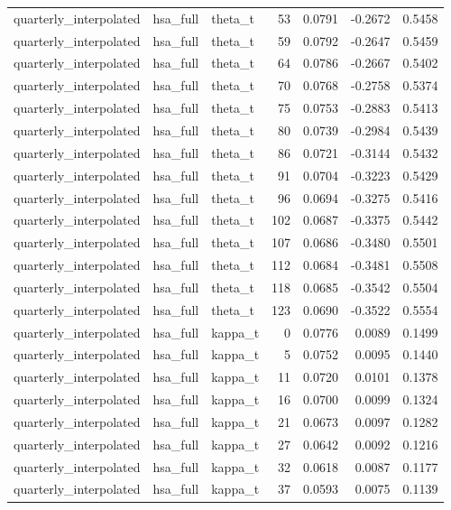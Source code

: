 \begin{tabular}{lllrrrr}
quarterly\_interpolated & hsa\_full & theta\_t & 53 & 0.0791 & -0.2672 & 0.5458 \\
quarterly\_interpolated & hsa\_full & theta\_t & 59 & 0.0792 & -0.2647 & 0.5459 \\
quarterly\_interpolated & hsa\_full & theta\_t & 64 & 0.0786 & -0.2667 & 0.5402 \\
quarterly\_interpolated & hsa\_full & theta\_t & 70 & 0.0768 & -0.2758 & 0.5374 \\
quarterly\_interpolated & hsa\_full & theta\_t & 75 & 0.0753 & -0.2883 & 0.5413 \\
quarterly\_interpolated & hsa\_full & theta\_t & 80 & 0.0739 & -0.2984 & 0.5439 \\
quarterly\_interpolated & hsa\_full & theta\_t & 86 & 0.0721 & -0.3144 & 0.5432 \\
quarterly\_interpolated & hsa\_full & theta\_t & 91 & 0.0704 & -0.3223 & 0.5429 \\
quarterly\_interpolated & hsa\_full & theta\_t & 96 & 0.0694 & -0.3275 & 0.5416 \\
quarterly\_interpolated & hsa\_full & theta\_t & 102 & 0.0687 & -0.3375 & 0.5442 \\
quarterly\_interpolated & hsa\_full & theta\_t & 107 & 0.0686 & -0.3480 & 0.5501 \\
quarterly\_interpolated & hsa\_full & theta\_t & 112 & 0.0684 & -0.3481 & 0.5508 \\
quarterly\_interpolated & hsa\_full & theta\_t & 118 & 0.0685 & -0.3542 & 0.5504 \\
quarterly\_interpolated & hsa\_full & theta\_t & 123 & 0.0690 & -0.3522 & 0.5554 \\
quarterly\_interpolated & hsa\_full & kappa\_t & 0 & 0.0776 & 0.0089 & 0.1499 \\
quarterly\_interpolated & hsa\_full & kappa\_t & 5 & 0.0752 & 0.0095 & 0.1440 \\
quarterly\_interpolated & hsa\_full & kappa\_t & 11 & 0.0720 & 0.0101 & 0.1378 \\
quarterly\_interpolated & hsa\_full & kappa\_t & 16 & 0.0700 & 0.0099 & 0.1324 \\
quarterly\_interpolated & hsa\_full & kappa\_t & 21 & 0.0673 & 0.0097 & 0.1282 \\
quarterly\_interpolated & hsa\_full & kappa\_t & 27 & 0.0642 & 0.0092 & 0.1216 \\
quarterly\_interpolated & hsa\_full & kappa\_t & 32 & 0.0618 & 0.0087 & 0.1177 \\
quarterly\_interpolated & hsa\_full & kappa\_t & 37 & 0.0593 & 0.0075 & 0.1139 \\

\end{tabular}
